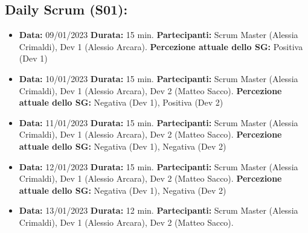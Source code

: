 \documentclass[a4paper, oneside]{article}
\newcommand\uno{Scrum Master (Alessia Crimaldi), Dev 1 (Alessio Arcara), Dev 2 (Matteo Sacco).}
\begin{document}
\begin{landscape}
        \newpage
        \normalsize
        \subsection{Daily Scrum (S01):}
        \begin{itemize}
            \item \textbf{Data:} 09/01/2023
            \newline \textbf{Durata:} 15 min.
            \newline \textbf{Partecipanti:} Scrum Master (Alessia Crimaldi), Dev 1 (Alessio Arcara).
            \newline \textbf{Percezione attuale dello SG:} Positiva (Dev 1)
        \end{itemize}
        \begin{itemize}
            \item \textbf{Data:} 10/01/2023
            \newline \textbf{Durata:} 15 min.
            \newline \textbf{Partecipanti:} \uno
            \newline \textbf{Percezione attuale dello SG:} Negativa (Dev 1), Positiva (Dev 2)
        \end{itemize}
        \begin{itemize}
            \item \textbf{Data:} 11/01/2023
            \newline \textbf{Durata:} 15 min.
            \newline \textbf{Partecipanti:} \uno
            \newline \textbf{Percezione attuale dello SG:} Negativa (Dev 1), Negativa (Dev 2)
        \end{itemize}
        \begin{itemize}
            \item \textbf{Data:} 12/01/2023
            \newline \textbf{Durata:} 15 min.
            \newline \textbf{Partecipanti:} \uno
            \newline \textbf{Percezione attuale dello SG:} Negativa (Dev 1), Negativa (Dev 2)
        \end{itemize}
        \begin{itemize}
            \item \textbf{Data:} 13/01/2023
            \newline \textbf{Durata:} 12 min.
            \newline \textbf{Partecipanti:} \uno

\end{itemize}
\end{landscape}
\end{document}
